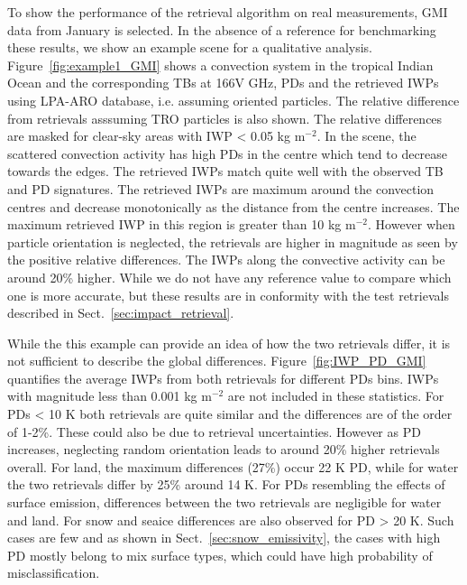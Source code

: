 \documentclass[amt, manuscript]{copernicus}
\begin{document}
To show the performance of the retrieval algorithm on real measurements, GMI data from January is selected. In the absence of a reference for benchmarking these results, we show an example scene for a qualitative analysis. Figure~\ref{fig:example1_GMI} shows a convection system in the tropical Indian Ocean and the corresponding TBs at 166V GHz, PDs and the retrieved IWPs using LPA-ARO database, i.e. assuming oriented particles. The relative difference from retrievals asssuming TRO particles is also shown. The relative differences are masked for clear-sky areas with IWP < 0.05 kg m$^{-2}$. In the scene, the scattered convection activity has high PDs in the centre which tend to decrease towards the edges. The retrieved IWPs match quite well with the observed TB and PD signatures. The retrieved IWPs are maximum around the convection centres and decrease monotonically as the distance from the centre increases. The maximum retrieved IWP in this region is greater than 10\,\,kg m$^{-2}$. However when particle orientation is neglected, the retrievals are higher in magnitude as seen by the positive relative differences. The IWPs along the convective activity can be around 20\% higher. While we do not have any reference value to compare which one is more accurate, but these results are in conformity with the test retrievals described in  Sect.~\ref{sec:impact_retrieval}.


While the this example can provide an idea of how the two retrievals differ, it is not sufficient to describe the global differences. Figure~\ref{fig:IWP_PD_GMI} quantifies the average IWPs from both retrievals for different PDs bins. IWPs with magnitude less than 0.001\,\,kg m$^{-2}$ are not included in these statistics. For PDs < 10\,\,K both retrievals are quite similar and the differences are of the order of 1-2\%. These could also be due to retrieval uncertainties. However as PD increases, neglecting random orientation leads to around 20\% higher retrievals overall. For land, the maximum differences (27\%) occur 22\,\,K PD, while for water the two retrievals differ by 25\% around 14\,\,K. For PDs resembling the effects of surface emission, differences between the two retrievals are negligible for water and land. For snow and seaice differences are also observed for PD > 20\,\,K.  Such cases are few and as shown in Sect.~\ref{sec:snow_emissivity}, the cases with high PD mostly belong to mix surface types, which could have high probability of misclassification.
\end{document}
